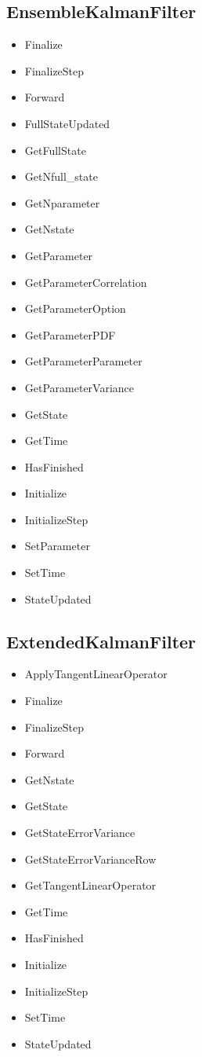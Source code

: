 \documentclass{tufte-book}
\begin{document}
\subsection{EnsembleKalmanFilter}

\begin{itemize}
\item Finalize
\item FinalizeStep
\item Forward
\item FullStateUpdated
\item GetFullState
\item GetNfull\_state
\item GetNparameter
\item GetNstate
\item GetParameter
\item GetParameterCorrelation
\item GetParameterOption
\item GetParameterPDF
\item GetParameterParameter
\item GetParameterVariance
\item GetState
\item GetTime
\item HasFinished
\item Initialize
\item InitializeStep
\item SetParameter
\item SetTime
\item StateUpdated
\end{itemize}



\subsection{ExtendedKalmanFilter}

\begin{itemize}
\item ApplyTangentLinearOperator
\item Finalize
\item FinalizeStep
\item Forward
\item GetNstate
\item GetState
\item GetStateErrorVariance
\item GetStateErrorVarianceRow
\item GetTangentLinearOperator
\item GetTime
\item HasFinished
\item Initialize
\item InitializeStep
\item SetTime
\item StateUpdated
\end{itemize}
\end{document}
